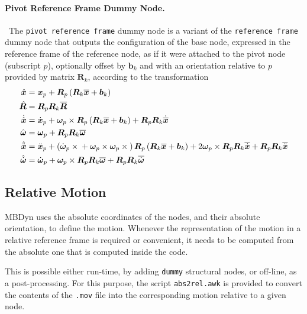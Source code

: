 \documentclass[10pt,dvips,fleqn,subeqn]{report}
\newcommand{\T}[1]{\bm{#1}}
\newcommand{\TT}[1]{\bm{#1}}
\begin{document}
\paragraph{Pivot Reference Frame Dummy Node.} \
The \texttt{pivot reference frame} dummy node is a variant
of the \texttt{reference frame} dummy node that outputs
the configuration of the base node, expressed in the reference
frame of the reference node, as if it were attached to the pivot node
(subscript $p$), optionally offset by $\T{b}_k$ and with
an orientation relative to $p$ provided by matrix $\T{R}_k$,
according to the transformation
\begin{subequations}
\begin{align}
	\hat{\T{x}} &= \T{x}_p + \T{R}_p\plbr{\T{R}_k \overline{\T{x}} + \T{b}_k} \\
	\hat{\T{R}} &= \T{R}_p \T{R}_k \overline{\T{R}} \\
	\dot{\hat{\T{x}}} &= \dot{\T{x}}_p
		+ \T{\omega}_p \times\T{R}_p \plbr{
			\T{R}_k \overline{\T{x}} + \T{b}_k
		} + \T{R}_p \T{R}_k \dot{\overline{\T{x}}} \\
	\hat{\T{\omega}} &= \T{\omega}_p + \T{R}_p \T{R}_k \overline{\T{\omega}} \\
	\hat{\ddot{\T{x}}} &= \ddot{\T{x}}_p
		+ \plbr{
			\dot{\T{\omega}}_p \times{}
			+ \T{\omega}_p \times \T{\omega}_p \times{}
		} \TT{R}_p \plbr{
			\TT{R}_k \overline{\T{x}} + \T{b}_k
		}
		+ 2 \T{\omega}_p \times \TT{R}_p \TT{R}_k \overline{\dot{\T{x}}}
		+ \TT{R}_p \TT{R}_k \overline{\ddot{\T{x}}} \\
	\hat{\dot{\T{\omega}}} &= \dot{\T{\omega}}_p
		+ \T{\omega}_p \times \TT{R}_p \TT{R}_k \overline{\T{\omega}}
		+ \TT{R}_p \TT{R}_k \overline{\dot{\T{\omega}}}
\end{align}
\end{subequations}


\subsection{Relative Motion}
\label{sec:nodes:structural nodes:relative motion}
MBDyn uses the absolute coordinates of the nodes,
and their absolute orientation, to define the motion.
Whenever the representation of the motion in a relative reference frame
is required or convenient, it needs to be computed
from the absolute one that is computed inside the code.

This is possible either run-time, by adding \texttt{dummy} structural nodes,
or off-line, as a post-processing.
For this purpose, the script \texttt{abs2rel.awk} is provided
to convert the contents of the \texttt{.mov} file
into the corresponding motion relative to a given node.
\end{document}
